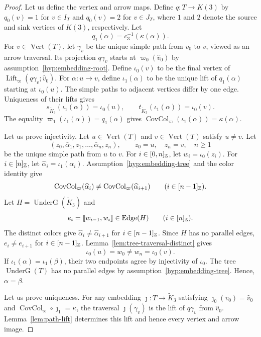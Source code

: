 \begin{proof}
Let us define the vertex and arrow maps.
Define $q:T\to K(3)$ by $q_0(v)=1$ for $v\in I_T$ and $q_0(v)=2$ for $v\in J_T$, where $1$ and $2$ denote the source and sink vertices of $K(3)$, respectively. Let
\[
 q_1(\alpha)=c_3^{-1}(\kappa(\alpha)).
\]
For $v\in\operatorname{Vert}(T)$, let $\gamma_v$ be the unique simple path from $v_0$ to $v$, viewed as an arrow traversal.
Its projection $q\gamma_v$ starts at $\varpi_0(\widehat v_0)$ by assumption~\ref{hyp:embedding-root}.
Define $\iota_0(v)$ to be the final vertex of $\operatorname{Lift}_{\varpi}(q\gamma_v;\widehat v_0)$.
For $\alpha:u\to v$, define $\iota_1(\alpha)$ to be the unique lift of $q_1(\alpha)$ starting at $\iota_0(u)$.
The simple paths to adjacent vertices differ by one edge.
Uniqueness of their lifts gives
\[
 s_{\widetilde K_3}(\iota_1(\alpha))=\iota_0(u),\qquad
 t_{\widetilde K_3}(\iota_1(\alpha))=\iota_0(v).
\]
The equality $\varpi_1(\iota_1(\alpha))=q_1(\alpha)$ gives $\operatorname{CovCol}_{\varpi}(\iota_1(\alpha))=\kappa(\alpha)$.

Let us prove injectivity.
Let $u\in\operatorname{Vert}(T)$ and $v\in\operatorname{Vert}(T)$ satisfy $u\ne v$.
Let
\[
 (z_0,\bar\alpha_1,z_1,\ldots,\bar\alpha_n,z_n),\qquad
 z_0=u,\quad z_n=v,\quad n\ge1
\]
be the unique simple path from $u$ to $v$.
For $i\in[0,n]_{\mathbb Z}$, let $w_i=\iota_0(z_i)$.
For $i\in[n]_{\mathbb Z}$, let $\widehat\alpha_i=\iota_1(\alpha_i)$.
Assumption~\ref{hyp:embedding-tree} and the color identity give
\[
 \operatorname{CovCol}_{\varpi}(\widehat\alpha_i)
 \ne\operatorname{CovCol}_{\varpi}(\widehat\alpha_{i+1})
 \qquad(i\in[n-1]_{\mathbb Z}).
\]
Let $H=\operatorname{UnderG}(\widetilde K_3)$ and
\[
 e_i=\llbracket w_{i-1},w_i\rrbracket\in\operatorname{Edge}(H)
 \qquad(i\in[n]_{\mathbb Z}).
\]
The distinct colors give $\widehat\alpha_i\ne\widehat\alpha_{i+1}$ for $i\in[n-1]_{\mathbb Z}$.
Since $H$ has no parallel edges, $e_i\ne e_{i+1}$ for $i\in[n-1]_{\mathbb Z}$.
Lemma~\ref{lem:tree-traversal-distinct} gives
\[
 \iota_0(u)=w_0\ne w_n=\iota_0(v).
\]
If $\iota_1(\alpha)=\iota_1(\beta)$, their two endpoints agree by injectivity of $\iota_0$.
The tree $\operatorname{UnderG}(T)$ has no parallel edges by assumption~\ref{hyp:embedding-tree}.
Hence, $\alpha=\beta$.

Let us prove uniqueness.
For any embedding $\jmath:T\to\widetilde K_3$ satisfying $\jmath_0(v_0)=\widehat v_0$ and $\operatorname{CovCol}_{\varpi}\circ\jmath_1=\kappa$, the traversal $\jmath(\gamma_v)$ is the lift of $q\gamma_v$ from $\widehat v_0$.
Lemma~\ref{lem:path-lift} determines this lift and hence every vertex and arrow image.
\end{proof}

